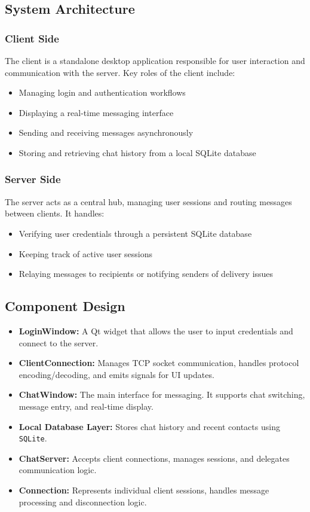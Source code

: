 \documentclass[12pt,a4paper]{article}
\begin{document}
  \subsection{System Architecture}
  
  \subsubsection{Client Side}
  The client is a standalone desktop application responsible for user interaction and communication with the server. Key roles of the client include:
  \begin{itemize}
	  \item Managing login and authentication workflows
	  \item Displaying a real-time messaging interface
	  \item Sending and receiving messages asynchronously
	  \item Storing and retrieving chat history from a local SQLite database
  \end{itemize}
  
  \subsubsection{Server Side}
  The server acts as a central hub, managing user sessions and routing messages between clients. It handles:
  \begin{itemize}
	  \item Verifying user credentials through a persistent SQLite database
	  \item Keeping track of active user sessions
	  \item Relaying messages to recipients or notifying senders of delivery issues
  \end{itemize}
  
  \subsection{Component Design}
  
  \begin{itemize}
	  \item \textbf{LoginWindow:} A Qt widget that allows the user to input credentials and connect to the server.
	  \item \textbf{ClientConnection:} Manages TCP socket communication, handles protocol encoding/decoding, and emits signals for UI updates.
	  \item \textbf{ChatWindow:} The main interface for messaging. It supports chat switching, message entry, and real-time display.
	  \item \textbf{Local Database Layer:} Stores chat history and recent contacts using \texttt{SQLite}.
	  \item \textbf{ChatServer:} Accepts client connections, manages sessions, and delegates communication logic.
	  \item \textbf{Connection:} Represents individual client sessions, handles message processing and disconnection logic.
  \end{itemize}
  
\end{document}
